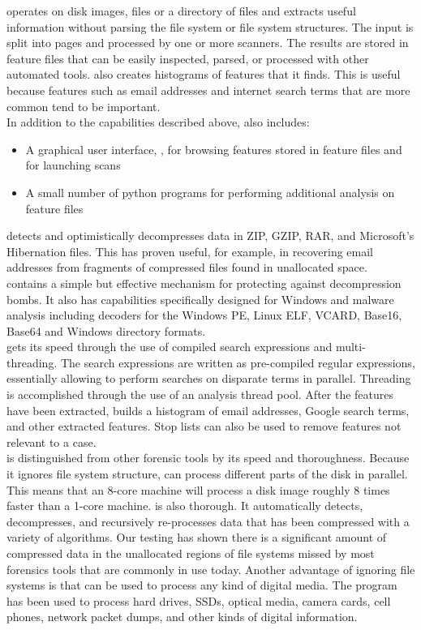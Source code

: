 \documentclass[11pt]{article} %
\begin{document}
\bulk operates on disk images, files or a directory of files and extracts useful information without parsing the file system or file system structures. The input is split into pages and processed by one or more scanners. The results are stored in feature files that can be easily inspected, parsed, or processed with other automated tools. \bulk also creates histograms of features that it finds. This is useful because features such as email addresses and internet search terms that are more common tend to be important. \\  

In addition to the capabilities described above, \bulk also includes:
\begin{itemize}	
	\item A graphical user interface, \viewer, for browsing features stored in feature files and for launching \bulk scans
	\item A small number of python programs for performing additional analysis on feature files
\end{itemize} 
 detects and optimistically decompresses data in ZIP, GZIP, RAR, and Microsoft's Hibernation files. This has proven useful, for example, in recovering email addresses from fragments of compressed files found in unallocated space. \\

\bulk contains a simple but effective mechanism for protecting against decompression bombs. It also has capabilities specifically designed for Windows and malware analysis including decoders for the Windows PE, Linux ELF, VCARD, Base16, Base64 and Windows directory formats.\\

\bulk gets its speed through the use of compiled search expressions and multi-threading. The search expressions are written as pre-compiled regular expressions, essentially allowing \bulk to perform searches on disparate terms in parallel. Threading is accomplished through the use of an analysis thread pool.  After the features have been extracted, \bulk builds a histogram of email addresses, Google search terms, and other extracted features. Stop lists can also be used to remove features not relevant to a case. \\

\bulk is distinguished from other forensic tools by its speed and thoroughness. Because it ignores file system structure, \bulk can process different parts of the disk in parallel. This means that an 8-core machine will process a disk image roughly 8 times faster than a 1-core machine. \bulk is also thorough. It automatically detects, decompresses, and recursively re-processes data that has been compressed with a variety of algorithms. Our testing has shown there is a significant amount of compressed data in the unallocated regions of file systems missed by most forensics tools that are commonly in use today\cite{encodedEvidence}.  Another advantage of ignoring file systems is that \bulk can be used to process any kind of digital media. The program has been used to process hard drives, SSDs, optical media, camera cards, cell phones, network packet dumps, and other kinds of digital information.\\
\end{document}
